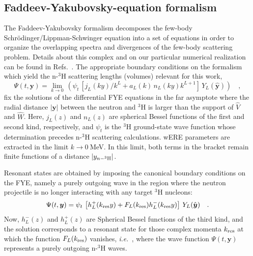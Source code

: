 \documentclass[5p,times]{elsarticle}
\newcommand{\ie}{\textit{i.e.}~}
\newcommand{\ve}[1]{\ensuremath{\boldsymbol{#1}}}
\begin{document}
\subsection{Faddeev-Yakubovsky-equation formalism}

The Faddeev-Yakubovsky formalism decomposes the few-body Schr\"odinger/Lippman-Schwinger equation into a
set of equations in order to organize the overlapping spectra and divergences of the few-body scattering 
problem. Details about this complex and on our particular numerical realization can be found in
Refs.~\cite{Lazauskas:2004hq,Lazauskas:2019hil}.
The appropriate boundary conditions on the formalism which yield the n-$^3$H scattering lengths (volumes)
relevant for this work,
%
\begin{equation}
\Psi(t,\ve{y})=\lim_{k\rightarrow0}\,\left(\psi_t\,\left[j_L(ky)/k^{L}+a_L(k)\, n_L(ky)k^{L+1}\right]\,Y_L(\hat{\ve{y}})\right)
\quad,  \label{eq:FYe_a}
\end{equation}
%
fix the solutions of the differential FYE equations in the far asymptote where the radial distance $\left|\ve{y}\right|$
between the neutron and $^3$H is larger than the support of $\hat{V}$ and $\hat{W}$.
Here, $j_L(z)$ and $n_L(z)$ are spherical Bessel functions of the first and second kind,
respectively, and 
$\psi_t$ is the $^3$H ground-state wave function whose determination precedes n-$^3$H scattering calculations. 
wERE parameters are extracted in the limit $k\to0~$MeV.
In this limit, both terms in the bracket remain finite functions of a distance $|y_{n-^3{\rm H}}|$.

Resonant states are obtained by imposing the canonical boundary conditions on the FYE, namely a purely outgoing wave
in the region where the neutron projectile is no longer interacting with any target $^3$H nucleons:
\begin{equation}
\Psi(t,\ve{y})=\psi_t\,\left[h_L^+(k_{\rm res}y)+F_L(k_{\rm res})h_L^-(k_{\rm res}y)\right]\,Y_L(\hat{\ve{y}})
\quad.  \label{eq:FYe_res}
\end{equation}
Now, $h_L^-(z)$ and $h_L^+(z)$ are Spherical Bessel functions of the third kind, and 
the solution corresponds to a resonant state for those complex momenta $k_{\rm res}$ at which the
function $F_L(k_{\rm res})$ vanishes, \ie, where the wave function $\Psi(t,\ve{y})$ represents
a purely outgoing n-$^3$H waves.
 
\end{document}
